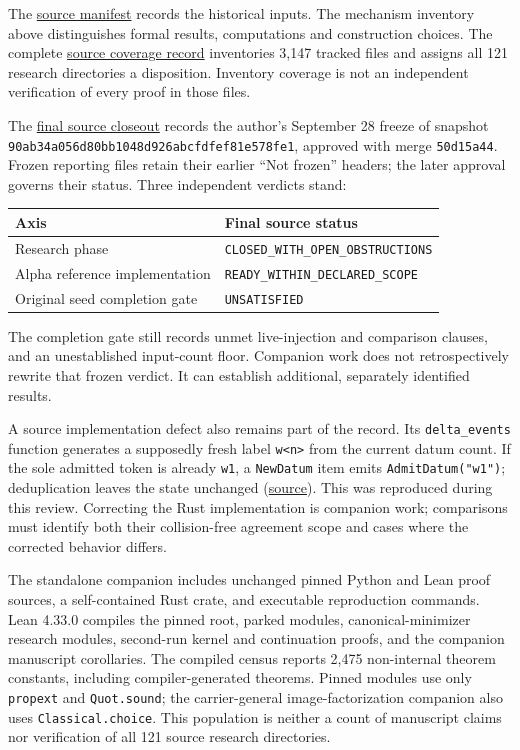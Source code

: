 \documentclass[
  11pt,
]{article}
\begin{document}
The \href{source_provenance.json}{source manifest} records the
historical inputs. The mechanism inventory above distinguishes formal
results, computations and construction choices. The complete
\href{docs/source_coverage.md}{source coverage record} inventories 3,147
tracked files and assigns all 121 research directories a disposition.
Inventory coverage is not an independent verification of every proof in
those files.

The \href{docs/sources/closeout.txt\#L490}{final source closeout}
records the author's September 28 freeze of snapshot
\nolinkurl{90ab34a056d80bb1048d926abcfdfef81e578fe1}, approved with merge
\nolinkurl{50d15a44}. Frozen reporting files retain their earlier ``Not
frozen'' headers; the later approval governs their status. Three
independent verdicts stand:

\Needspace{100pt}
\begin{longtable}[]{@{}ll@{}}
\toprule\noalign{}
Axis & Final source status \\
\midrule\noalign{}
\endhead
\bottomrule\noalign{}
\endlastfoot
Research phase & \nolinkurl{CLOSED_WITH_OPEN_OBSTRUCTIONS} \\
Alpha reference implementation &
\nolinkurl{READY_WITHIN_DECLARED_SCOPE} \\
Original seed completion gate & \nolinkurl{UNSATISFIED} \\
\end{longtable}

The completion gate still records unmet live-injection and comparison
clauses, and an unestablished input-count floor. Companion work does not
retrospectively rewrite that frozen verdict. It can establish
additional, separately identified results.

A source implementation defect also remains part of the record. Its
\nolinkurl{delta_events} function generates a supposedly fresh label
\texttt{w\textless{}n\textgreater{}} from the current datum count. If
the sole admitted token is already \nolinkurl{w1}, a \nolinkurl{NewDatum} item
emits \texttt{AdmitDatum("w1")}; deduplication leaves the state
unchanged (\href{code/derivation/candidates.py\#L114}{source}). This was
reproduced during this review. Correcting the Rust implementation is
companion work; comparisons must identify both their collision-free
agreement scope and cases where the corrected behavior differs.

The standalone companion includes unchanged pinned Python and Lean proof
sources, a self-contained Rust crate, and executable reproduction
commands. Lean 4.33.0 compiles the pinned root, parked modules,
canonical-minimizer research modules, second-run kernel and continuation
proofs, and the companion manuscript corollaries. The compiled census
reports 2,475 non-internal theorem constants, including
compiler-generated theorems. Pinned modules use only \nolinkurl{propext}
and \nolinkurl{Quot.sound}; the carrier-general image-factorization
companion also uses \nolinkurl{Classical.choice}. This population is
neither a count of manuscript claims nor verification of all 121 source
research directories.
\end{document}
